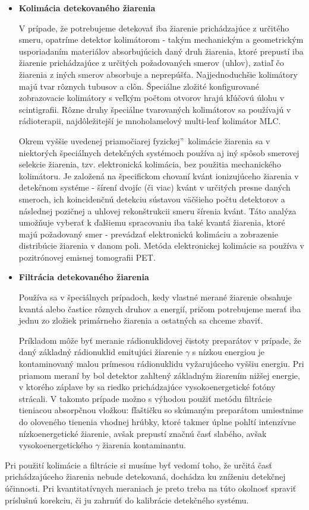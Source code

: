 \documentclass[../../main.tex]{subfiles}
\begin{document}
\begin{itemize}
\item \textbf{Kolimácia detekovaného žiarenia}

V prípade, že potrebujeme detekovať iba žiarenie prichádzajúce z určitého smeru, opatríme detektor kolimátorom - takým mechanickým a geometrickým usporiadaním materiálov absorbujúcich daný druh žiarenia, ktoré prepustí iba žiarenie prichádzajúce z určitých požadovaných smerov (uhlov), zatiaľ čo žiarenia z iných smerov absorbuje a neprepúšťa. Najjednoduchšie kolimátory majú tvar rôznych tubusov a clôn. Špeciálne zložité konfigurované zobrazovacie kolimátory s veľkým počtom otvorov hrajú kľúčovú úlohu v scintigrafii. Rôzne druhy špeciálne tvarovaných kolimátorov sa používajú v rádioterapii, najdôležitejší je mnoholamelový multi-leaf kolimátor MLC.

Okrem vyššie uvedenej priamočiarej \quotedblbase fyzickej\textquotedblright ~kolimácie žiarenia sa v niektorých špeciálnych detekčných systémoch používa aj iný spôsob smerovej selekcie žiarenia, tzv. elektronická kolimácia, bez použitia mechanického kolimátoru. Je založená na špecifickom chovaní kvánt ionizujúceho žiarenia v detekčnom systéme - šírení dvojíc (či viac) kvánt v určitých presne daných smeroch, ich koincidenčnú detekciu sústavou väčšieho počtu detektorov a následnej pozičnej a uhlovej rekonštrukcii smeru šírenia kvánt. Táto analýza umožňuje vyberať k ďalšiemu spracovaniu iba také kvantá žiarenia, ktoré majú požadovaný smer - prevádzať elektronickú kolimáciu a zobrazenie distribúcie žiarenia v danom poli. Metóda elektronickej kolimácie sa používa v pozitrónovej emisnej tomografii PET.


\item \textbf{Filtrácia detekovaného žiarenia}

Používa sa v špeciálnych prípadoch, kedy vlastné merané žiarenie obsahuje kvantá alebo častice rôznych druhov a energií, pričom potrebujeme merať iba jednu zo zložiek primárneho žiarenia a ostatných sa chceme zbaviť. 

Príkladom môže byť meranie rádionuklidovej čistoty preparátov v prípade, že daný základný rádionuklid emitujúci žiarenie $\gamma$ s nízkou energiou je kontaminovaný malou prímesou rádionuklidu vyžarujúceho vyššiu energiu. Pri priamom meraní by bol detektor zahltený základným žiarením nižšej energie, v ktorého záplave by sa riedko prichádzajúce vysokoenergetické fotóny strácali. V takomto prípade možno s výhodou použiť metódu filtrácie tieniacou absorpčnou vložkou: fľaštičku so skúmaným preparátom umiestnime do oloveného tienenia vhodnej hrúbky, ktoré takmer úplne pohltí intenzívne nízkoenergetické žiarenie, avšak prepustí značnú časť slabého, avšak vysokoenergetického $\gamma$ žiarenia kontaminantu.

\end{itemize}

Pri použití kolimácie a filtrácie si musíme byť vedomí toho, že určitá časť prichádzajúceho žiarenia nebude detekovaná, dochádza ku zníženiu detekčnej účinnosti. Pri kvantitatívnych meraniach je preto treba na túto okolnosť spraviť príslušnú korekciu, či ju zahrnúť do kalibrácie detekčného systému.
\end{document}
